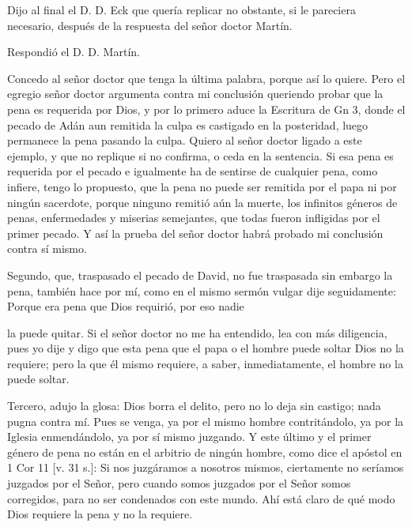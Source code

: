 Dijo al final el D. D. Eck que quería replicar no obstante, si le pareciera necesario, después de la respuesta del señor doctor Martín.

Respondió el D. D. Martín.

Concedo al señor doctor que tenga la última palabra, porque así lo quiere. Pero el egregio señor doctor argumenta contra mi conclusión queriendo probar que la pena es requerida por Dios, y por lo primero aduce la Escritura de Gn 3, donde el pecado de Adán aun remitida la culpa es castigado en la posteridad, luego permanece la pena pasando la culpa. Quiero al señor doctor ligado a este ejemplo, y que no replique si no confirma, o ceda en la sentencia. Si esa pena es requerida por el pecado e igualmente ha de sentirse de cualquier pena, como infiere, tengo lo propuesto, que la pena no puede ser remitida por el papa ni por ningún sacerdote, porque ninguno remitió aún la muerte, los infinitos géneros de penas, enfermedades y miserias semejantes, que todas fueron infligidas por el primer pecado. Y así la prueba del señor doctor habrá probado mi conclusión contra sí mismo.

Segundo, que, traspasado el pecado de David, no fue traspasada sin embargo la pena, también hace por mí, como en el mismo sermón vulgar dije seguidamente: Porque era pena que Dios requirió, por eso nadie

la puede quitar. Si el señor doctor no me ha entendido, lea con más diligencia, pues yo dije y digo que esta pena que el papa o el hombre puede soltar Dios no la requiere; pero la que él mismo requiere, a saber, inmediatamente, el hombre no la puede soltar.

Tercero, adujo la glosa: Dios borra el delito, pero no lo deja sin castigo; nada pugna contra mí. Pues se venga, ya por el mismo hombre contritándolo, ya por la Iglesia enmendándolo, ya por sí mismo juzgando. Y este último y el primer género de pena no están en el arbitrio de ningún hombre, como dice el apóstol en 1 Cor 11 [v. 31 s.]: Si nos juzgáramos a nosotros mismos, ciertamente no seríamos juzgados por el Señor, pero cuando somos juzgados por el Señor somos corregidos, para no ser condenados con este mundo. Ahí está claro de qué modo Dios requiere la pena y no la requiere.

